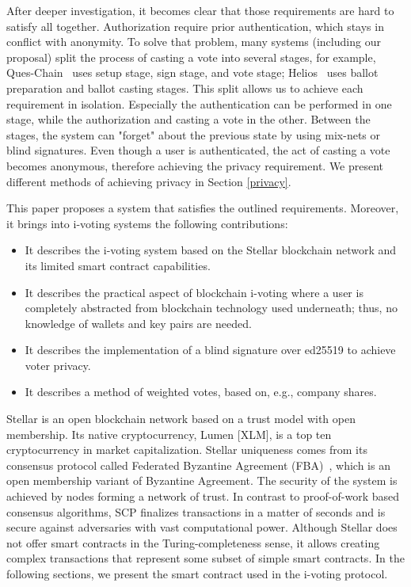 \documentclass[applsci,article,submit,moreauthors,pdftex]{Definitions/mdpi}
\begin{document}
After deeper investigation, it becomes clear that those requirements are hard to satisfy all together. Authorization require prior authentication, which stays in conflict with anonymity. 
To solve that problem, many systems (including our proposal) split the process of casting a vote into several stages, for example, Ques-Chain~\cite{zhang2019ques} uses setup stage, sign stage, and vote stage; Helios~\cite{adida2008helios} uses ballot preparation and ballot casting stages. This split allows us to achieve each requirement in isolation. Especially the authentication can be performed in one stage, while the authorization and casting a vote in the other. Between the stages, the system can "forget" about the previous state by using mix-nets or blind signatures. Even though a user is authenticated, the act of casting a vote becomes anonymous, therefore achieving the privacy requirement. We present different methods of achieving privacy in Section \ref{privacy}.

This paper proposes a system that satisfies the outlined requirements. Moreover, it brings into i-voting systems the following contributions:
\begin{itemize}
    \item It describes the i-voting system based on the Stellar blockchain network and its limited smart contract capabilities.
    \item It describes the practical aspect of blockchain i-voting where a user is completely abstracted from blockchain technology used underneath; thus, no knowledge of wallets and key pairs are needed.
    \item It describes the implementation of a blind signature over ed25519 to achieve voter privacy.
    \item It describes a method of weighted votes, based on, e.g., company shares.
\end{itemize}
 

Stellar is an open blockchain network based on a trust model with open membership. Its native cryptocurrency, Lumen [XLM], is a top ten cryptocurrency in market capitalization. Stellar uniqueness comes from its consensus protocol called Federated Byzantine Agreement (FBA)~\cite{mazieres2015Stellar}, which is an open membership variant of Byzantine Agreement. The security of the system is achieved by nodes forming a network of trust. In contrast to proof-of-work based consensus algorithms, SCP finalizes transactions in a matter of seconds and is secure against adversaries with vast computational power. Although Stellar does not offer smart contracts in the Turing-completeness sense, it allows creating complex transactions that represent some subset of simple smart contracts. In the following sections, we present the smart contract used in the i-voting protocol.
\end{document}
